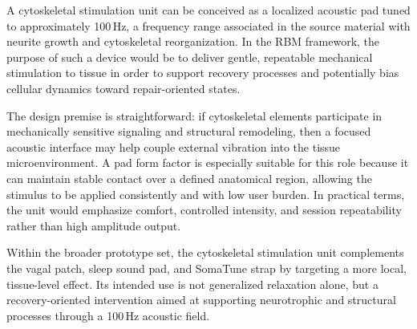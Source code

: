A cytoskeletal stimulation unit can be conceived as a localized acoustic pad tuned to approximately 100\,Hz, a frequency range associated in the source material with neurite growth and cytoskeletal reorganization. In the RBM framework, the purpose of such a device would be to deliver gentle, repeatable mechanical stimulation to tissue in order to support recovery processes and potentially bias cellular dynamics toward repair-oriented states.

The design premise is straightforward: if cytoskeletal elements participate in mechanically sensitive signaling and structural remodeling, then a focused acoustic interface may help couple external vibration into the tissue microenvironment. A pad form factor is especially suitable for this role because it can maintain stable contact over a defined anatomical region, allowing the stimulus to be applied consistently and with low user burden. In practical terms, the unit would emphasize comfort, controlled intensity, and session repeatability rather than high amplitude output.

Within the broader prototype set, the cytoskeletal stimulation unit complements the vagal patch, sleep sound pad, and SomaTune strap by targeting a more local, tissue-level effect. Its intended use is not generalized relaxation alone, but a recovery-oriented intervention aimed at supporting neurotrophic and structural processes through a 100\,Hz acoustic field.
